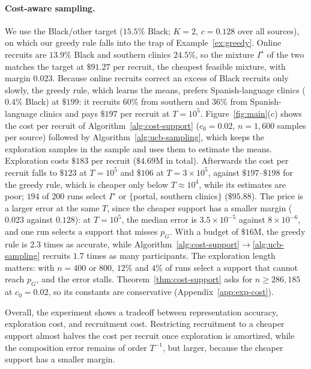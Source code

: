 \documentclass[twoside]{article}
\begin{document}
\paragraph{Cost-aware sampling.}
We use the Black/other target (\(15.5\%\) Black; \(K=2\), \(c=0.128\) over
all sources), on which our greedy rule falls into the trap of
Example~\ref{ex:greedy}. Online recruits are \(13.9\%\) Black and southern
clinics \(24.5\%\), so the mixture \(I^\star\) of the two matches the target
at \(\$91.27\) per recruit, the cheapest feasible mixture, with margin
\(0.023\). Because online recruits correct an excess of Black recruits only
slowly, the greedy rule, which learns the means, prefers Spanish-language
clinics (\(0.4\%\) Black) at \(\$199\): it recruits \(60\%\) from southern
and \(36\%\) from Spanish-language clinics and pays \(\$197\) per recruit at
\(T=10^5\). Figure~\ref{fig:main}(c) shows the cost per recruit of
Algorithm~\ref{alg:cost-support} (\(c_0=0.02\), \(n=1{,}600\) samples per
source) followed by Algorithm~\ref{alg:ucb-sampling}, which keeps the
exploration samples in the sample and uses them to estimate the means.
Exploration costs \(\$183\) per recruit (\(\$4.69\)M in total). Afterwards
the cost per recruit falls to \(\$123\) at \(T=10^5\) and \(\$106\) at
\(T=3\times10^5\), against \(\$197\)--\(\$198\) for the greedy rule, which
is cheaper only below \(T\approx10^4\), while its estimates are poor;
\(194\) of \(200\) runs select \(I^\star\) or \(\{\)portal, southern
clinics\(\}\) (\(\$95.88\)). The price is a larger error at the same \(T\),
since the cheaper support has a smaller margin (\(0.023\) against
\(0.128\)): at \(T=10^5\), the median error is \(3.5\times10^{-5}\) against
\(8\times10^{-6}\), and one run selects a support that misses \(p_G\). With
a budget of \(\$16\)M, the greedy rule is \(2.3\) times as accurate, while
Algorithm~\ref{alg:cost-support}\(\to\)\ref{alg:ucb-sampling} recruits
\(1.7\) times as many participants. The exploration length matters: with
\(n=400\) or \(800\), \(12\%\) and \(4\%\) of runs select a support that
cannot reach \(p_G\), and the error stalls. Theorem~\ref{thm:cost-support}
asks for \(n\ge286{,}185\) at \(c_0=0.02\), so its constants are
conservative (Appendix~\ref{app:exp-cost}).

Overall, the experiment shows a tradeoff between representation accuracy,
exploration cost, and recruitment cost. Restricting recruitment to a cheaper
support almost halves the cost per recruit once exploration is amortized,
while the composition error remains of order \(T^{-1}\), but larger, because
the cheaper support has a smaller margin.
\end{document}
